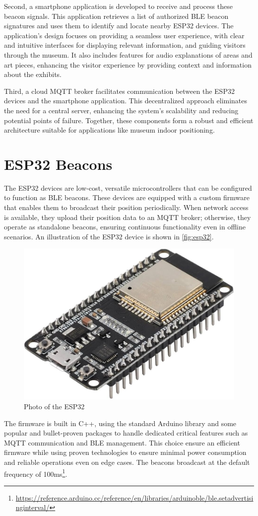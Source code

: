 Second, a smartphone application is developed to receive and process these beacon signals. This application retrieves a list of authorized BLE beacon signatures and uses them to identify and locate nearby ESP32 devices. The application’s design focuses on providing a seamless user experience, with clear and intuitive interfaces for displaying relevant information, and guiding visitors through the museum. It also includes features for audio explanations of areas and art pieces, enhancing the visitor experience by providing context and information about the exhibits.

Third, a cloud MQTT broker facilitates communication between the ESP32 devices and the smartphone application. This decentralized approach eliminates the need for a central server, enhancing the system’s scalability and reducing potential points of failure. Together, these components form a robust and efficient architecture suitable for applications like museum indoor positioning.

\section{ESP32 Beacons}
The ESP32 devices are low-cost, versatile microcontrollers that can be configured to function as BLE beacons. These devices are equipped with a custom firmware that enables them to broadcast their position periodically. When network access is available, they upload their position data to an MQTT broker; otherwise, they operate as standalone beacons, ensuring continuous functionality even in offline scenarios. An illustration of the ESP32 device is shown in \autoref{fig:esp32}.

\begin{figure}
    \centering
    \includegraphics[width=0.5\linewidth]{assets/image-esp32.jpg}
    \caption{Photo of the ESP32}
    \label{fig:esp32}
\end{figure}

The firmware is built in C++, using the standard Arduino library and some popular and bullet-proven packages to handle dedicated critical features such as MQTT communication and BLE management. This choice ensure an efficient firmware while using proven technologies to ensure minimal power consumption and reliable operations even on edge cases. The beacons broadcast at the default frequency of 100ms\footnote{\url{https://reference.arduino.cc/reference/en/libraries/arduinoble/ble.setadvertisinginterval/}}.

